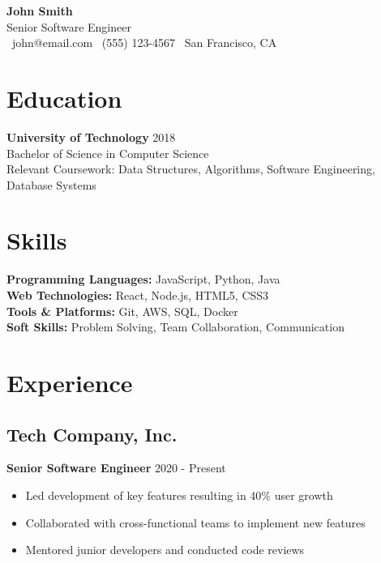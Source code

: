 \documentclass[11pt,a4paper]{article}
\begin{document}
\begin{center}
    {\Huge\textbf{John Smith}}\\[6pt]
    {\large\textcolor{accent}{Senior Software Engineer}}\\[6pt]
    \textcolor{text}{
        \faEnvelope\ john@email.com \quad
        \faPhone\ (555) 123-4567 \quad
        \faMapMarker\ San Francisco, CA
    }
\end{center}

\vspace{0.5em}

\section{Education}
\textbf{University of Technology} \hfill \textcolor{text}{2018}\\
Bachelor of Science in Computer Science\\
\textcolor{text}{Relevant Coursework: Data Structures, Algorithms, Software Engineering, Database Systems}

\section{Skills}
\textbf{Programming Languages:} JavaScript, Python, Java\\
\textbf{Web Technologies:} React, Node.js, HTML5, CSS3\\
\textbf{Tools \& Platforms:} Git, AWS, SQL, Docker\\
\textbf{Soft Skills:} Problem Solving, Team Collaboration, Communication

\section{Experience}
\subsection*{Tech Company, Inc.}
\textbf{Senior Software Engineer} \hfill \textcolor{text}{2020 - Present}
\begin{itemize}[leftmargin=*]
    \item Led development of key features resulting in 40\% user growth
    \item Collaborated with cross-functional teams to implement new features
    \item Mentored junior developers and conducted code reviews
\end{itemize}
\end{document}
